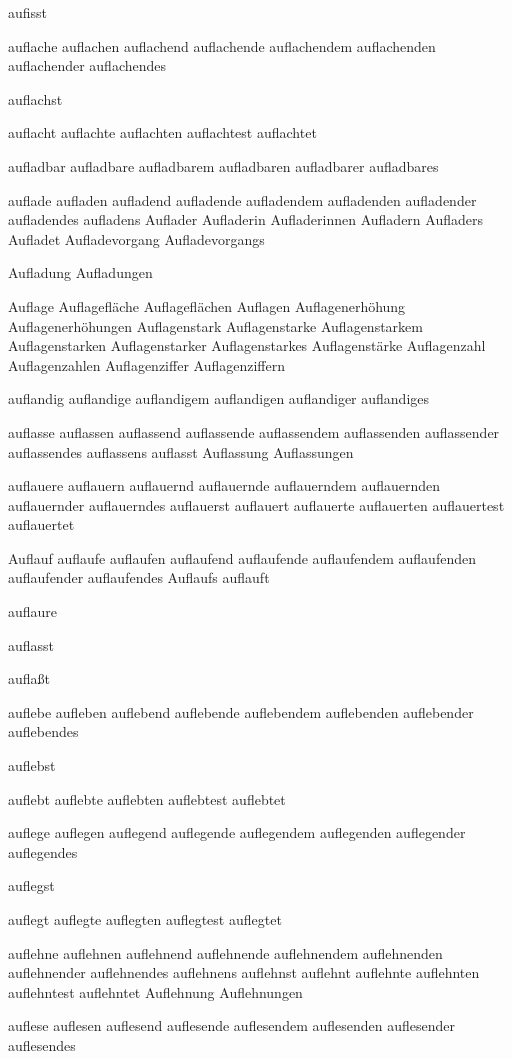 aufisst

auflache auflachen auflachend auflachende auflachendem auflachenden auflachender auflachendes

auflachst

auflacht auflachte auflachten auflachtest auflachtet

aufladbar aufladbare aufladbarem aufladbaren aufladbarer aufladbares

auflade aufladen aufladend aufladende aufladendem aufladenden aufladender aufladendes aufladens Auflader Aufladerin Aufladerinnen Aufladern Aufladers Aufladet Aufladevorgang Aufladevorgangs

Aufladung Aufladungen

Auflage Auflagefläche Auflageflächen Auflagen Auflagenerhöhung Auflagenerhöhungen Auflagenstark Auflagenstarke Auflagenstarkem Auflagenstarken Auflagenstarker Auflagenstarkes Auflagenstärke Auflagenzahl Auflagenzahlen Auflagenziffer Auflagenziffern

auflandig auflandige auflandigem auflandigen auflandiger auflandiges

auflasse auflassen auflassend auflassende auflassendem auflassenden auflassender auflassendes auflassens auflasst Auflassung Auflassungen

auflauere auflauern auflauernd auflauernde auflauerndem auflauernden auflauernder auflauerndes auflauerst auflauert auflauerte auflauerten auflauertest auflauertet

Auflauf auflaufe auflaufen auflaufend auflaufende auflaufendem auflaufenden auflaufender auflaufendes Auflaufs auflauft

auflaure

auflasst

auflaßt

auflebe aufleben auflebend auflebende auflebendem auflebenden auflebender auflebendes

auflebst

auflebt auflebte auflebten auflebtest auflebtet

auflege auflegen auflegend auflegende auflegendem auflegenden auflegender auflegendes

auflegst

auflegt auflegte auflegten auflegtest auflegtet

auflehne auflehnen auflehnend auflehnende auflehnendem auflehnenden auflehnender auflehnendes auflehnens auflehnst auflehnt auflehnte auflehnten auflehntest auflehntet Auflehnung Auflehnungen

auflese auflesen auflesend auflesende auflesendem auflesenden auflesender auflesendes


